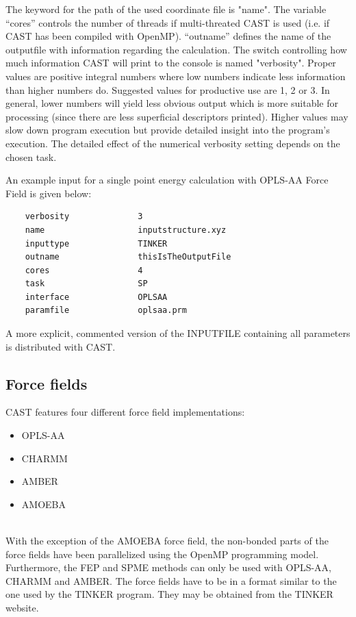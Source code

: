 \documentclass[10pt,a4paper]{article} %
\begin{document}
	The keyword for the path of the used coordinate file is "name". The variable “cores” controls the number of threads if multi-threated \ac{CAST} is used (i.e. if \ac{CAST} has been compiled with OpenMP\supercite{openmp08}). “outname” defines the name of the outputfile with information regarding the calculation.
	The switch controlling how much information \ac{CAST} will print to the console is named "verbosity". Proper values are positive integral numbers where low numbers indicate less information than higher numbers do. Suggested values for productive use are 1, 2 or 3. In general, lower numbers will yield less obvious output which is  more suitable for processing (since there are less superficial descriptors printed). Higher values may slow down program execution but provide detailed insight into the program's execution. The detailed effect of the numerical verbosity setting depends on the chosen task.

	An example input for a single point energy calculation with \ac{OPLS-AA} Force Field\supercite{oplsaa, oplsaa2} is given below:
	
	\begin{lstlisting}
	verbosity              3
	name                   inputstructure.xyz
	inputtype              TINKER
	outname                thisIsTheOutputFile
	cores                  4
	task                   SP
	interface              OPLSAA
	paramfile              oplsaa.prm\end{lstlisting}

	A more explicit, commented version of the INPUTFILE containing all parameters is distributed with \ac{CAST}.

	\subsection{Force fields}
	\ac{CAST} features four different force field implementations:\\
	\begin{itemize}
	 \item \acf{OPLS-AA}\supercite{oplsaa, oplsaa2} \item \acf{CHARMM}\supercite{charmm}
	 \item \acf{AMBER}\supercite{amber}
	 \item \acf{AMOEBA}\supercite{amoeba_current, amoeba_current2}
	\end{itemize}~\\
	With the exception of the \ac{AMOEBA} force field, the non-bonded parts of the force fields have been parallelized using the OpenMP programming model. Furthermore, the \ac{FEP} and \ac{SPME} methods can only be used with \ac{OPLS-AA}, \ac{CHARMM} and \ac{AMBER}. The force fields have to be in a format similar to the one used by the TINKER\supercite{tinker} program. They may be obtained from the TINKER\supercite{tinker} website.
\end{document}
